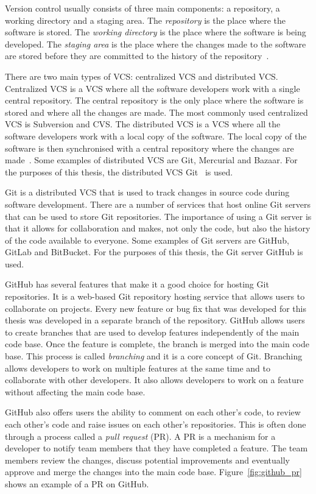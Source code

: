 Version control usually consists of three main components: a repository, a
working directory and a staging area.
The \textit{repository} is the place where the software is stored.
The \textit{working directory} is the place where the software is being
developed.
The \textit{staging area} is the place where the changes made to the software
are stored before they are committed to the history of the
repository~\cite{blischak2016quick}.

There are two main types of VCS: centralized VCS and distributed VCS.
Centralized VCS is a VCS where all the software developers work with a single
central repository.
The central repository is the only place where the software is stored and
where all the changes are made.
The most commonly used centralized VCS is Subversion and CVS.
The distributed VCS is a VCS where all the software developers work with a
local copy of the software.
The local copy of the software is then synchronised with a central repository
where the changes are made~\cite{zolkifli2018version}.
Some examples of distributed VCS are Git, Mercurial and Bazaar.
For the purposes of this thesis, the distributed VCS
Git~\cite{spinellis2012git} is used.

Git is a distributed VCS that is used to track changes in source code during
software development.
There are a number of services that host online Git servers that can be used to
store Git repositories.
The importance of using a Git server is that it allows for collaboration and
makes, not only the code, but also the history of the code available to
everyone.
Some examples of Git servers are GitHub, GitLab and BitBucket.
For the purposes of this thesis, the Git server GitHub is used.

GitHub has several features that make it a good choice for hosting Git
repositories.
It is a web-based Git repository hosting service that allows users to
collaborate on projects.
Every new feature or bug fix that was developed for this thesis was developed
in a separate branch of the repository.
GitHub allows users to create branches that are used to develop features
independently of the main code base.
Once the feature is complete, the branch is merged into the main code base.
This process is called \textit{branching} and it is a core concept of Git.
Branching allows developers to work on multiple features at the same time and
to collaborate with other developers.
It also allows developers to work on a feature without affecting the main code
base.

GitHub also offers users the ability to comment on each other's code, to review
each other's code and raise issues on each other's repositories.
This is often done through a process called a \textit{pull request} (PR).
A PR is a mechanism for a developer to notify team members that they have
completed a feature.
The team members review the changes, discuss potential improvements and
eventually approve and merge the changes into the main code base.
Figure~\ref{fig:github_pr} shows an example of a PR on GitHub.

